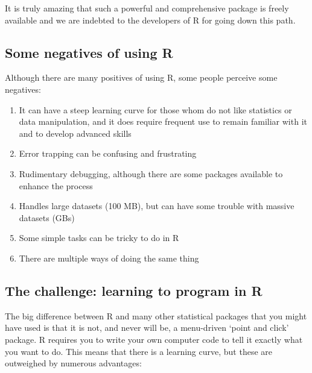 \documentclass[
]{book}
\begin{document}
It is truly amazing that such a powerful and comprehensive package is freely available and we are indebted to the developers of R for going down this path.

\hypertarget{some-negatives-of-using-r}{%
\subsection{Some negatives of using R}\label{some-negatives-of-using-r}}

Although there are many positives of using R, some people perceive some negatives:

\begin{enumerate}
\def\labelenumi{\arabic{enumi}.}
\item
  It can have a steep learning curve for those whom do not like statistics or data manipulation, and it does require frequent use to remain familiar with it and to develop advanced skills
\item
  Error trapping can be confusing and frustrating
\item
  Rudimentary debugging, although there are some packages available to enhance the process
\item
  Handles large datasets (100 MB), but can have some trouble with massive datasets (GBs)
\item
  Some simple tasks can be tricky to do in R
\item
  There are multiple ways of doing the same thing
\end{enumerate}

\hypertarget{the-challenge-learning-to-program-in-r}{%
\subsection{The challenge: learning to program in R}\label{the-challenge-learning-to-program-in-r}}

The big difference between R and many other statistical packages that you might have used is that it is not, and never will be, a menu-driven `point and click' package. R requires you to write your own computer code to tell it exactly what you want to do. This means that there is a learning curve, but these are outweighed by numerous advantages:
\end{document}
